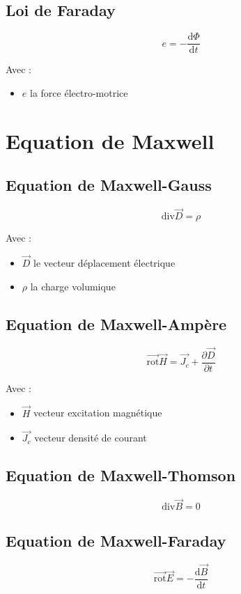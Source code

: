 \documentclass[a4paper, 11pt]{article}
\newcommand{\ve}{\overrightarrow}
\newcommand{\dv}{\mathrm{div}}
\begin{document}
    \subsection{Loi de Faraday}

    $$ e = - \frac{\mathrm{d}\Phi}{\mathrm{d}t}$$

    Avec :
    \begin{itemize}
        \item $e$ la force électro-motrice
    \end{itemize}

    \section{Equation de Maxwell}

    \subsection{Equation de Maxwell-Gauss}

    $$\dv\ve{D} = \rho$$

    Avec :
    \begin{itemize}
        \item $\ve{D}$ le vecteur déplacement électrique
        \item $\rho$ la charge volumique
    \end{itemize}

    \subsection{Equation de Maxwell-Ampère}

    $$\ve{\mathrm{rot}}\ve{H} = \ve{J_c} + \frac{\partial\ve{D}}{\partial t}$$

    Avec :
    \begin{itemize}
        \item $\ve{H}$ vecteur excitation magnétique
        \item $\ve{J_c}$ vecteur densité de courant
    \end{itemize}

    \subsection{Equation de Maxwell-Thomson}

    $$\dv\ve{B} = 0$$


    \subsection{Equation de Maxwell-Faraday}

    $$\ve{\mathrm{rot}}\ve{E} = -\frac{\mathrm{d}\ve{B}}{\mathrm{d}t}$$
\end{document}
